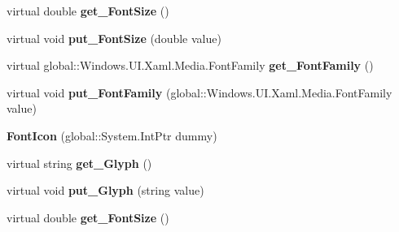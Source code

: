 \begin{DoxyCompactItemize}
\mbox{\label{class_windows_1_1_u_i_1_1_xaml_1_1_controls_1_1_font_icon_a56c9091282a44095056b589c9e417ec8}} 
virtual double {\bfseries get\+\_\+\+Font\+Size} ()
\item 
\mbox{\label{class_windows_1_1_u_i_1_1_xaml_1_1_controls_1_1_font_icon_ab6e9c5d300ab27fe473978c6792a49a5}} 
virtual void {\bfseries put\+\_\+\+Font\+Size} (double value)
\item 
\mbox{\label{class_windows_1_1_u_i_1_1_xaml_1_1_controls_1_1_font_icon_a1ec67522af9017e450d6266855bc81d5}} 
virtual global\+::\+Windows.\+U\+I.\+Xaml.\+Media.\+Font\+Family {\bfseries get\+\_\+\+Font\+Family} ()
\item 
\mbox{\label{class_windows_1_1_u_i_1_1_xaml_1_1_controls_1_1_font_icon_a1f39590903627ddd712e1b20dba0c7ff}} 
virtual void {\bfseries put\+\_\+\+Font\+Family} (global\+::\+Windows.\+U\+I.\+Xaml.\+Media.\+Font\+Family value)
\item 
\mbox{\label{class_windows_1_1_u_i_1_1_xaml_1_1_controls_1_1_font_icon_a8416249e681423ded4616ce07522b6aa}} 
{\bfseries Font\+Icon} (global\+::\+System.\+Int\+Ptr dummy)
\item 
\mbox{\label{class_windows_1_1_u_i_1_1_xaml_1_1_controls_1_1_font_icon_a5eed21875f8e0fd909a420f8ddf1d1a9}} 
virtual string {\bfseries get\+\_\+\+Glyph} ()
\item 
\mbox{\label{class_windows_1_1_u_i_1_1_xaml_1_1_controls_1_1_font_icon_adce42635121ffcf86756f04dc4002c0c}} 
virtual void {\bfseries put\+\_\+\+Glyph} (string value)
\item 
\mbox{\label{class_windows_1_1_u_i_1_1_xaml_1_1_controls_1_1_font_icon_a56c9091282a44095056b589c9e417ec8}} 
virtual double {\bfseries get\+\_\+\+Font\+Size} ()
\item 

\end{DoxyCompactItemize}
